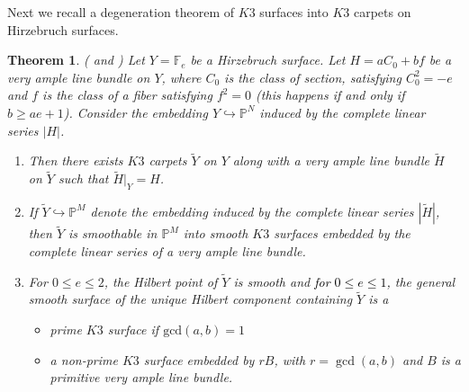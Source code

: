 \documentclass[11pt,twoside]{amsart}
\theoremstyle{plain}
\newtheorem{theorem}{Theorem}[section]
\theoremstyle{definition}
\begin{document}
Next we recall a degeneration theorem of $K3$ surfaces into $K3$ carpets on Hirzebruch surfaces.

\begin{theorem}\label{degeneration into $K3$ carpets}(\cite[ \textcolor{black}{Theorems $3.1, 4.3, 4.4, 5.1$}]{BMR21} and \cite[\textcolor{black}{Proposition $1.7$, Theorems $3.5, 4.1$}]{GP97})
Let $Y = \mathbb{F}_e$ be a Hirzebruch surface. Let $H = aC_0+bf$ be a very ample line bundle on $Y$, where $C_0$ is the class of section, satisfying $C_0^2 = -e$ and $f$ is the class of a fiber satisfying $f^2 = 0$ (this happens if and only if $b \geq ae+1$). Consider the embedding $Y \hookrightarrow \mathbb{P}^N$ induced by the complete linear series $|H|$.  
\begin{enumerate}
    \item Then there exists $K3$ carpets $\widetilde{Y}$ on $Y$ along with a very ample line bundle $\widetilde{H}$ on $\widetilde{Y}$ such that $\widetilde{H}|_Y = H$.

    \item If $\widetilde{Y} \hookrightarrow \mathbb{P}^M$ denote the embedding induced by the complete linear series $|\widetilde{H}|$, then $\widetilde{Y}$ is smoothable in $\mathbb{P}^M$ into smooth $K3$ surfaces embedded by the complete linear series of a very ample line bundle.

    \item For $0 \leq e \leq 2$, the Hilbert point of $\widetilde{Y}$ is smooth and \textcolor{black}{for} \textcolor{black}{$0 \leq e \leq 1$,} the general smooth surface of the unique Hilbert component containing $\widetilde{Y}$ is a 
    \begin{itemize}
        \item[(a)] prime $K3$ surface if $\textrm{gcd}(a,b) = 1$ 
        \item[(b)] a non-prime $K3$ surface embedded by $rB$, with $r = \operatorname{gcd}(a,b)$ and $B$ is a primitive very ample line bundle. 
    \end{itemize}
\end{enumerate}
\end{theorem}
\end{document}
